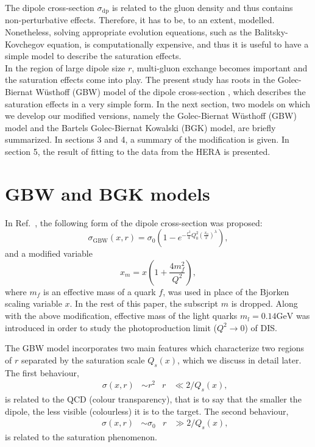\documentclass[11pt]{article}
\begin{document}
The dipole cross-section $\sigma_{\mathrm{dp}}$ is related to the gluon density and thus contains non-perturbative effects. {\color{blue} Therefore, it has to be, to an extent, modelled. Nonetheless, solving appropriate evolution equeations, such as the Balitsky-Kovchegov equation, is computationally expensive, and thus it is useful to have a simple model to describe the saturation effects.}\\
In the region of large dipole size $r$, multi-gluon exchange becomes important and the saturation effects come into play. The present study has roots in the Golec-Biernat W\"usthoff (GBW) model of the dipole cross-section \cite{gbw1998}, which describes the saturation effects in a very simple form.
In the next section, two models on which we develop our modified versions, namely the Golec-Biernat W\"usthoff (GBW) model\cite{gbw1998} and the Bartels Golec-Biernat Kowalski (BGK) model\cite{bgk2002}, are briefly summarized.  In sections 3 and 4, a summary of the modification is given. In section 5, the result of fitting to the data from the HERA\cite{hera} is presented. %
 
\section{GBW and BGK models }
In Ref.~\cite{gbw1998}, the following form of the dipole cross-section was proposed:
\begin{equation}
\sigma_{\mathrm{GBW}}(x ,r )=\sigma_{0} \left(1-e^{-\frac{r^2}{4} Q_0^2\left(\frac{x_0}{x}\right)^{\lambda} }\right),
\label{eq:gbw}
\end{equation}
and a modified variable 
\begin{equation}
x_m=x \left(1+\frac{4 m_f^2}{Q^2}\right),
\label{eq:modx}
\end{equation}
where $m_f$ is an effective mass of a quark $f$,
was used in place of the Bjorken scaling variable $x$. In the rest of this paper, the subscript $m$ is dropped. Along with the above modification, effective mass of the light quarks $m_l=0.14\mathrm{GeV}$ was introduced in order to study the photoproduction limit ($Q^2\rightarrow0$) of DIS. 

The GBW model incorporates two main features which characterize two regions of $r$ separated by the saturation scale $Q_s(x)$, which we discuss in detail later.
The first behaviour, 
\begin{align}
&& \sigma(x,r)&\sim r^2 & r&\ll 2/Q_s(x),
\end{align}
is related to the QCD (colour transparency), that is to say that the smaller the dipole, the less visible (colourless) it is to the target. 
The second behaviour,
\begin{align}
&& \sigma(x,r)&\sim \sigma_0 & r&\gg 2/Q_s(x),
\end{align}
is related to the saturation phenomenon. \\
\end{document}
